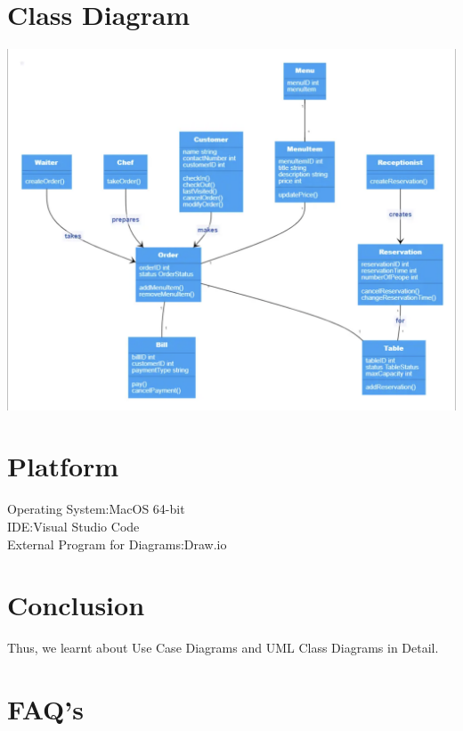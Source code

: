 \documentclass{article}
\begin{document}
\section{\textbf{Class Diagram}}
\begin{center}
	\includegraphics[scale=0.5]{casediagram}
\end{center}
\section{\textbf{Platform}}
Operating System:MacOS 64-bit\\
IDE:Visual Studio Code\\
External Program for Diagrams:Draw.io\\
\section{\textbf{Conclusion}}
Thus, we learnt about Use Case Diagrams and UML Class Diagrams in Detail.
\pagebreak
\section{\textbf{FAQ's}}
\end{document}
